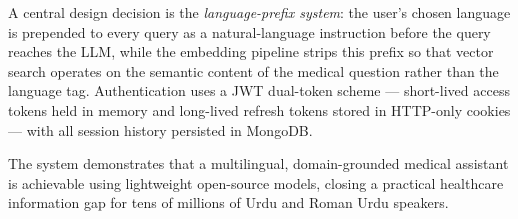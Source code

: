 \documentclass[12pt, a4paper, oneside]{report}
\begin{document}
A central design decision is the \textit{language-prefix system}: the user's chosen
language is prepended to every query as a natural-language instruction before the query
reaches the LLM, while the embedding pipeline strips this prefix so that vector search
operates on the semantic content of the medical question rather than the language tag.
Authentication uses a JWT dual-token scheme --- short-lived access tokens held in memory
and long-lived refresh tokens stored in HTTP-only cookies --- with all session history
persisted in MongoDB.

The system demonstrates that a multilingual, domain-grounded medical assistant is
achievable using lightweight open-source models, closing a practical healthcare information
gap for tens of millions of Urdu and Roman Urdu speakers.

\clearpage
\tableofcontents

\clearpage
\listoffigures
{}

\clearpage
\listoftables
{}

\clearpage
{}






\clearpage
{}


\end{document}
